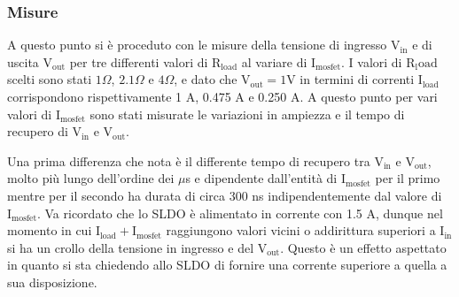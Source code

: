 \subsubsection{Misure}
A questo punto si è proceduto con le misure della tensione di ingresso $\mathrm{V_{in}}$ e di uscita $\mathrm{V_{out}}$ per tre differenti valori di $\mathrm{R_{load}}$ al variare di $\mathrm{I_{mosfet}}$. I valori di $\mathrm{R_load}$ scelti sono stati $1 \Omega$, $2.1 \Omega$ e $4 \Omega$, e dato che $\mathrm{V_{out}=1V}$ in termini di correnti  $\mathrm{I_{load}}$ corrispondono rispettivamente 1 A, 0.475 A e 0.250 A. A questo punto per vari valori di $\mathrm{I_{mosfet}}$ sono stati misurate le variazioni in ampiezza e il tempo di recupero di $\mathrm{V_{in}}$ e $\mathrm{V_{out}}$.

Una prima differenza che nota è il differente tempo di recupero tra $\mathrm{V_{in}}$ e $\mathrm{V_{out}}$, molto più lungo dell'ordine dei $\mu$s e dipendente dall'entità di $\mathrm{I_{mosfet}}$ per il primo mentre per il secondo ha durata di circa 300 ns indipendentemente dal valore di $\mathrm{I_{mosfet}}$.
Va ricordato che lo SLDO è alimentato in corrente con 1.5 A, dunque nel momento in cui $\mathrm{I_{load}+I_{mosfet}}$ raggiungono valori vicini o addirittura superiori  a $\mathrm{I_{in}}$ si ha un crollo della tensione in ingresso e del $\mathrm{V_{out}}$. Questo è un effetto aspettato in quanto si sta chiedendo allo SLDO di fornire una corrente superiore a quella a sua disposizione.


